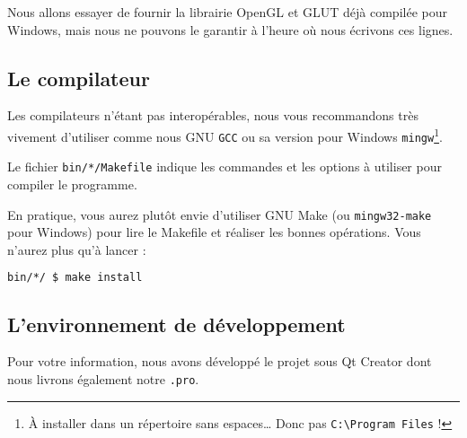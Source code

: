 \documentclass[a4paper, oneside, 11pt, twocolumn]{article}
\begin{document}
Nous allons essayer de fournir la librairie OpenGL et GLUT déjà compilée pour Windows, mais nous ne pouvons le garantir à l'heure où nous écrivons ces lignes.

\subsection{Le compilateur}

Les compilateurs n'étant pas interopérables, nous vous recommandons {\huge très vivement} d'utiliser comme nous GNU \texttt{GCC} ou sa version pour Windows \texttt{mingw}\footnote{À installer dans un répertoire sans espaces\dots{} Donc pas \texttt{C:\textbackslash Program Files} !}.

Le fichier \texttt{bin/*/Makefile} indique les commandes et les options à utiliser pour compiler le programme.

En pratique, vous aurez plutôt envie d'utiliser GNU Make (ou \texttt{mingw32-make} pour Windows) pour lire le Makefile et réaliser les bonnes opérations. Vous n'aurez plus qu'à lancer :

\begin{lstlisting}[language=bash, float=h, caption={Compiler le programme}, basicstyle=\small]
bin/*/ $ make install
\end{lstlisting}

\subsection{L'environnement de développement}

Pour votre information, nous avons développé le projet sous Qt Creator dont nous livrons également notre \texttt{.pro}.
\end{document}
